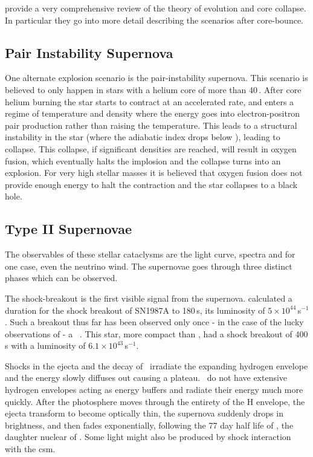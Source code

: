  \citet{2002RvMP...74.1015W} provide a very comprehensive review of the theory of evolution and core collapse. In particular they go into more detail describing the scenarios after core-bounce.

\subsection{Pair Instability Supernova}
One alternate explosion scenario is the pair-instability supernova. This scenario is believed to only happen in stars with a helium core of more than 40\,\msun. After core helium burning the star starts to contract at an accelerated rate, and enters a regime of temperature and density where the energy goes into electron-positron pair production rather than raising the temperature. This leads to a structural instability in the star (where the adiabatic index drops below ), leading to collapse. This collapse, if significant densities are reached, will result in oxygen fusion, which eventually halts the implosion and the collapse turns into an explosion. For very high stellar masses it is believed that oxygen fusion does not provide enough energy to halt the contraction and the star collapses to a black hole.


\subsection{Type II Supernovae}
The observables of these stellar cataclysms are the light curve, spectra and for one case, even the neutrino wind. The supernovae goes through three distinct phases which can be observed. 

The shock-breakout is the first visible signal from the supernova.  \cite{1992ApJ...393..742E} calculated a duration for the  shock breakout of SN1987A to 180\,s, its  luminosity of $5\times10^{44}$\erg\,s$^{-1}$. 
Such a breakout thus far has been observed only once - in the case of the lucky observations of  - a \snibc\ \citep{2008Natur.453..469S}. This star, more compact than , had a shock breakout of 400\,s with a luminosity of $6.1\times10^{43}$\erg\,s$^{-1}$.

Shocks in the ejecta and the decay of \Ni\ irradiate the expanding hydrogen envelope and the energy slowly diffuses out causing a plateau. \sniil\ do not have extensive hydrogen envelopes acting as energy buffers and radiate their energy much more quickly. After the photosphere moves through the entirety of the H envelope, the ejecta transform to become optically thin, the supernova suddenly drops in brightness, and then fades exponentially, following the 77 day half life of \Co, the daughter nuclear of \Ni. Some light might also be produced by shock interaction with the \gls{csm}.





